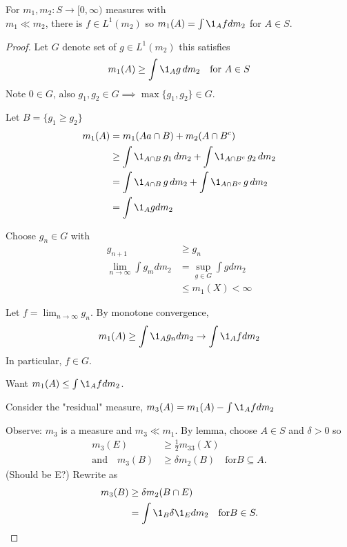 \begin{theorem}
	For $m_1, m_2 : S \to [0, \infty) $ measures with \\
	$m_1 \ll m_2$, there is  $f \in L^1 (m_2)$ so
	$m_1 (A) = \int \1_A f dm_2$ for $A \in S$.
\end{theorem}

\begin{proof}
	Let $G$ denote set of $g \in L^1 (m_2)$ this satisfies
	\begin{align*}
		m_1 (A) \geq \int \1_A g \, dm_2 \quad \text{for } A \in S
	\end{align*}
	Note $0 \in G$, also
	$g_1 , g_2 \in G \implies \max \{g_1, g_2\} \in G$.

	Let $B = \{g_1 \geq g_2\}$
	\begin{align*}
		m_1 (A) &= m_1 (Aa \cap B) + m_2 (A \cap B^c) \\
				&\geq \int \1_{A \cap B} \, g_1 \, d m_2 + \int \1_{A \cap B^c} \, g_2 \, dm_2 \\
				&= \int \1_{A \cap B} \, g \, d m_2 + \int \1_{A \cap B^c} \, g \, dm_2 \\
				&= \int \1_A g dm_2
	\end{align*}

	Choose $g_n \in G$ with
	\begin{align*}
		g_{n+1} &\geq g_n \\
		\lim_{n \to \infty} \int g_{m} d m_2 &= \sup_{g \in G} \int g dm_2 \\
											 &\leq m_1 (X) < \infty
	\end{align*}

	Let $f = \lim_{n\to \infty} g_n$. By monotone convergence,
	\begin{align*}
		m_1 (A) \geq \int \1_A g_n dm_2 \to \int \1_{A} f dm_2
	\end{align*} In particular, $f \in G$.

	Want $m_1 (A) \leq \int \1_{A} f dm_2$.

	Consider the "residual" measure, $m_3 (A) = m_1 (A) - \int \1_{A} f dm_2$

	Observe: $m_3$ is a measure and $m_3 \ll m_1$.
	By lemma, choose $A \in S$ and $\delta > 0$ so
	\begin{align*}
							m_3 (E) &\geq \frac{1}{2} m_33 (X) \\
		\text{and} \quad 	m_3 (B) &\geq \delta m_2 (B) \quad \text{for} B \subseteq A.
	\end{align*} (Should be E?)
	Rewrite as
	\begin{align*}
		m_3 (B) &\geq \delta m_2 ( B \cap E) \\
				&= \int \1_{B} \delta \1_E d m_2 \quad \text{for} B \in S.
	\end{align*}


\end{proof}
